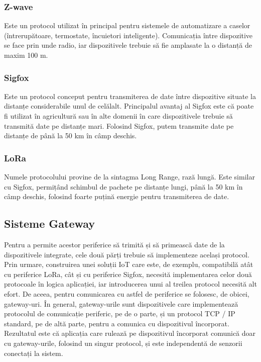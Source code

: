 \subsubsection{Z-wave}
\label{sec:embed:bus:wireless:zwave}

Este un protocol utilizat în principal
pentru sistemele de automatizare a caselor (întrerupătoare, termostate,
încuietori inteligente). Comunicația între dispozitive se face prin unde radio,
iar dispozitivele trebuie să fie amplasate la o distanță de maxim 100 m.

\subsubsection{Sigfox}
\label{sec:embed:bus:wireless:sigfox}

Este un protocol conceput
pentru transmiterea de date între dispozitive situate la distanțe considerabile
unul de celălalt. Principalul avantaj al Sigfox este că poate fi utilizat în
agricultură sau în alte domenii în care dispozitivele trebuie să transmită date
pe distanțe mari. Folosind Sigfox, putem transmite date pe distanțe de până la
50 km în câmp deschis.

\subsubsection{LoRa}
\label{sec:embed:bus:wireless:lora}

Numele protocolului provine de la sintagma Long Range, rază lungă. Este similar cu
Sigfox, permițând schimbul de pachete pe distanțe lungi, până la 50 km în câmp
deschis, folosind foarte puțină energie pentru transmiterea de date.

\subsection{Sisteme Gateway}
\label{sec:embed:bus:gateway}

Pentru a permite acestor periferice să trimită și să primească date de la
dispozitivele integrate, cele două părți trebuie să implementeze același
protocol. Prin urmare, construirea unei soluții IoT care este, de exemplu,
compatibilă atât cu periferice LoRa, cât și cu periferice Sigfox, necesită implementarea celor
două protocoale în logica aplicației, iar introducerea unui al treilea protocol
necesită alt efort. De aceea, pentru comunicarea cu astfel de
periferice se folosesc, de obicei, gateway-uri. În general, gateway-urile sunt
dispozitivele care implementează protocolul de comunicație periferic, pe de o
parte, și un protocol TCP / IP standard, pe de altă parte, pentru a comunica cu
dispozitivul încorporat. Rezultatul este că aplicația care rulează pe
dispozitivul încorporat comunică doar cu gateway-urile, folosind un singur
protocol, și este independentă de senzorii conectați la sistem.

